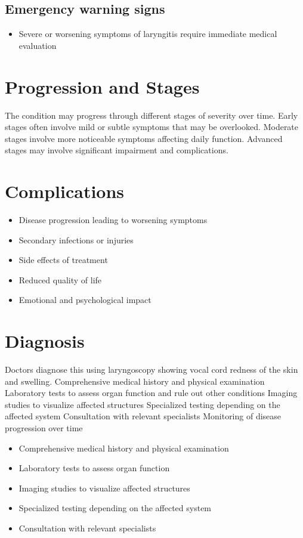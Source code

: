 \subsection{Emergency warning signs}
\begin{itemize}[noitemsep]
  \item Severe or worsening symptoms of laryngitis require immediate medical evaluation
\end{itemize}
\section{Progression and Stages}
The condition may progress through different stages of severity over time. Early stages often involve mild or subtle symptoms that may be overlooked. Moderate stages involve more noticeable symptoms affecting daily function. Advanced stages may involve significant impairment and complications.
\section{Complications}
\begin{itemize}[noitemsep]
  \item Disease progression leading to worsening symptoms
  \item Secondary infections or injuries
  \item Side effects of treatment
  \item Reduced quality of life
  \item Emotional and psychological impact
\end{itemize}
\section{Diagnosis}
Doctors diagnose this using laryngoscopy showing vocal cord redness of the skin and swelling. Comprehensive medical history and physical examination Laboratory tests to assess organ function and rule out other conditions Imaging studies to visualize affected structures Specialized testing depending on the affected system Consultation with relevant specialists Monitoring of disease progression over time

\begin{itemize}[noitemsep]
  \item Comprehensive medical history and physical examination
  \item Laboratory tests to assess organ function
  \item Imaging studies to visualize affected structures
  \item Specialized testing depending on the affected system
  \item Consultation with relevant specialists
\end{itemize}
